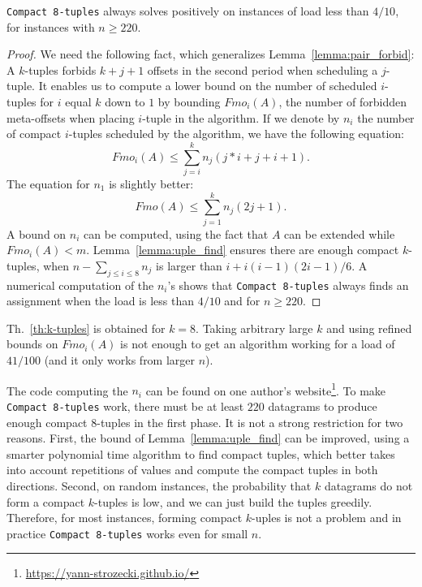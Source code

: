 \begin{theorem}\label{th:k-tuples}
\texttt{Compact 8-tuples} always solves \pma positively on instances of load less than $4/10$, for instances with $n \geq 220$.
\end{theorem}
\begin{proof}
We need the following fact, which generalizes Lemma~\ref{lemma:pair_forbid}: A $k$-tuples forbids $k+j+1$ offsets in the second period when scheduling a $j$-tuple. %
It enables us to compute a lower bound on the number of scheduled $i$-tuples for $i$ equal $k$ down to $1$ by bounding $Fmo_i(A)$, the number of forbidden meta-offsets when placing $i$-tuple in the algorithm.
If we denote by $n_i$ the number of compact $i$-tuples scheduled by the algorithm,
we have the following equation:  $$ Fmo_i(A) \leq \displaystyle{\sum_{j=i}^k n_j(j*i + j + i+ 1)}.$$
The equation for $n_1$ is slightly better: 
$$ Fmo(A) \leq \displaystyle{\sum_{j=1}^k n_j(2j + 1)}.$$
A bound on $n_i$ can be computed, using the fact that $A$ can be extended while $Fmo_i(A) < m$. 
Lemma~\ref{lemma:uple_find} ensures there are enough compact $k$-tuples, when $n - \sum_{j \leq i \leq 8} n_j$ is larger than $i + i(i-1)(2i-1)/6$. 
A numerical computation of the $n_i$'s shows that \texttt{Compact 8-tuples} always finds an assignment when the load is less than $4/10$ and for $n \geq 220$.
\end{proof}

Th.~\ref{th:k-tuples} is obtained for $k=8$. Taking arbitrary large $k$ and using refined bounds on $Fmo_i(A)$ is not enough to get an algorithm working for a load of $41/100$ (and it only works from larger $n$).

The code computing the $n_i$ can be found on one author's website\footnote{\url{https://yann-strozecki.github.io/}}.
To make \texttt{Compact 8-tuples} work, there must be at least $220$ datagrams to
produce enough compact $8$-tuples in the first phase. It is not a strong restriction for two reasons. First, the bound of Lemma~\ref{lemma:uple_find} can be improved, using a smarter polynomial time algorithm to find compact tuples, which better takes into account repetitions of values and compute the compact tuples in both directions. Second, on random instances, the probability that $k$ datagrams do not form a compact $k$-tuples is low, and we can just build the tuples greedily. Therefore, for most instances, forming compact $k$-uples is not a problem and in practice \texttt{Compact 8-tuples} works even for small $n$.




